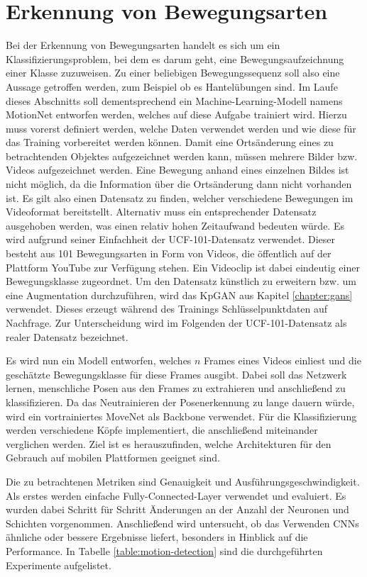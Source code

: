 \section{Erkennung von Bewegungsarten}
Bei der Erkennung von Bewegungsarten handelt es sich um ein
Klassifizierungsproblem, bei dem es darum geht, eine Bewegungsaufzeichnung
einer Klasse zuzuweisen. Zu einer beliebigen Bewegungssequenz soll also eine
Aussage getroffen werden, zum Beispiel ob es Hantelübungen sind. Im Laufe dieses
Abschnitts soll dementsprechend ein Machine-Learning-Modell namens MotionNet
entworfen werden, welches auf diese Aufgabe trainiert wird. Hierzu muss vorerst
definiert werden, welche Daten verwendet werden und wie diese für das Training
vorbereitet werden können. Damit eine Ortsänderung eines zu betrachtenden
Objektes aufgezeichnet werden kann, müssen mehrere Bilder bzw. Videos
aufgezeichnet werden. Eine Bewegung anhand eines einzelnen Bildes ist nicht
möglich, da die Information über die Ortsänderung dann nicht vorhanden ist. Es
gilt also einen Datensatz zu finden, welcher verschiedene Bewegungen im
Videoformat bereitstellt. Alternativ muss ein entsprechender Datensatz
ausgehoben werden, was einen relativ hohen Zeitaufwand bedeuten würde. Es wird
aufgrund seiner Einfachheit der UCF-101-Datensatz \cite{ucf101} verwendet.
Dieser besteht aus 101 Bewegungsarten in Form von Videos, die öffentlich auf der
Plattform YouTube zur Verfügung stehen. Ein Videoclip ist dabei eindeutig einer
Bewegungsklasse zugeordnet. Um den Datensatz künstlich zu erweitern bzw. um eine
Augmentation durchzuführen, wird das KpGAN aus Kapitel \ref{chapter:gans}
verwendet. Dieses erzeugt während des Trainings Schlüsselpunktdaten auf
Nachfrage. Zur Unterscheidung wird im Folgenden der UCF-101-Datensatz als realer
Datensatz bezeichnet.

Es wird nun ein Modell entworfen, welches $n$ Frames eines Videos einliest und
die geschätzte Bewegungsklasse für diese Frames ausgibt. Dabei soll das Netzwerk
lernen, menschliche Posen aus den Frames zu extrahieren und anschließend zu
klassifizieren. Da das Neutrainieren der Posenerkennung zu lange dauern würde,
wird ein vortrainiertes MoveNet als Backbone verwendet. Für die Klassifizierung
werden verschiedene Köpfe implementiert, die anschließend miteinander verglichen
werden. Ziel ist es herauszufinden, welche Architekturen für den Gebrauch auf
mobilen Plattformen geeignet sind.

Die zu betrachtenen Metriken sind Genauigkeit und
Aus\-führ\-ungs\-ge\-schwin\-dig\-keit. Als erstes werden einfache
Fully-Connected-Layer verwendet und evaluiert. Es wurden dabei Schritt für
Schritt Änderungen an der Anzahl der Neuronen und Schichten vorgenommen.
Anschließend wird untersucht, ob das Verwenden CNNs ähnliche oder bessere
Ergebnisse liefert, besonders in Hinblick auf die Performance. In Tabelle
\ref{table:motion-detection} sind die durchgeführten Experimente aufgelistet.


